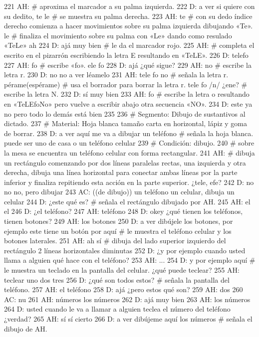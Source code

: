 221 AH: # aproxima el marcador a su palma izquierda.
222 D: a ver si quiere con su dedito, te le # se muestra su palma derecha.
223 AH: te # con su dedo índice derecho comienza a hacer movimientos sobre su palma izquierda dibujando «Te». le # finaliza el movimiento sobre su palma con «Le» dando como resulado «TeLe» ah
224 D: ajá muy bien # le da el marcador rojo.
225 AH: # completa el escrito en el pizarrón escribiendo la letra E resultando en «TeLE».
226 D: telefo
227 AH: fo # escribe «fo». ele fo
228 D: ajá ¿qué sigue?
229 AH: no # escribe la letra r.
230 D: no no a ver léamelo
231 AH: tele fo no # señala la letra r. pérame(espérame) # usa el borrador para borrar la letra r. tele fo /n/ ¿ene? # escribe la letra N.
232 D: sí muy bien
233 AH: fo # escribe la letra o resultando en «TeLEfoNo» pero vuelve a escribir abajo otra secuencia «NO».
234 D: este ya no pero todo lo demás está bien
235 
236 # Segmento: Dibujo de sustantivos al dictado.
237 # Material: Hoja blanca tamaño carta en horizontal, lápiz y goma de borrar.
238 D: a ver aquí me va a dibujar un teléfono # señala la hoja blanca. puede ser uno de casa o un teléfono celular
239 # Condición: dibujo.
240 # sobre la mesa se encuentra un teléfono celular con forma rectangular.
241 AH: # dibuja un rectángulo comenzando por dos líneas paralelas rectas, una izquierda y otra derecha, dibuja una línea horizontal para conectar ambas líneas por la parte inferior y finaliza repitiendo esta acción en la parte superior. ¿tele, efe?
242 D: no no no, pero dibujar
243 AC: ((de dibujo)) un teléfono un celular, dibuja un celular
244 D: ¿este qué es? # señala el rectángulo dibujado por AH.
245 AH: el el
246 D: ¿el teléfono?
247 AH: teléfono
248 D: okey ¿qué tienen los teléfonos, tienen botones?
249 AH: los botones
250 D: a ver dibújele los botones, por ejemplo este tiene un botón por aquí # le muestra el teléfono celular y los botones laterales.
251 AH: ah sí # dibuja del lado superior izquierdo del rectángulo 2 líneas horizontales diminutas
252 D: ¿y por ejemplo cuando usted llama a alguien qué hace con el teléfono?
253 AH: ...
254 D: y por ejemplo aquí # le muestra un teclado en la pantalla del celular. ¿qué puede teclear?
255 AH: teclear uno dos tres
256 D: ¿qué son todos estos? # señala la pantalla del teléfono.
257 AH: el teléfono
258 D: ajá ¿pero estos qué son?
259 AH: dos
260 AC: nu
261 AH: números los números
262 D: ajá muy bien
263 AH: los números
264 D: usted cuando le va a llamar a alguien teclea el número del teléfono ¿verdad?
265 AH: sí sí cierto
266 D: a ver dibújeme aquí los números # señala el dibujo de AH.

